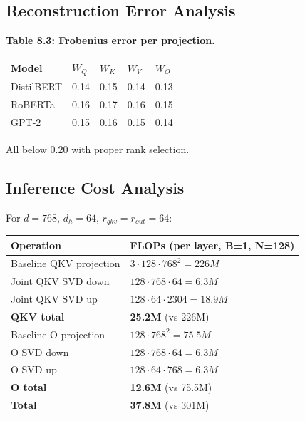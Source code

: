 \subsection{Reconstruction Error Analysis}

\textbf{Table 8.3: Frobenius error per projection.}

\begin{table}[H]
\centering
\small
\begin{tabular}{lllll}
\toprule
\textbf{Model} & \textbf{$W_Q$} & \textbf{$W_K$} & \textbf{$W_V$} & \textbf{$W_O$} \\
\midrule
DistilBERT & 0.14 & 0.15 & 0.14 & 0.13 \\
RoBERTa & 0.16 & 0.17 & 0.16 & 0.15 \\
GPT-2 & 0.15 & 0.16 & 0.15 & 0.14 \\
\bottomrule
\end{tabular}
\end{table}

All below 0.20 with proper rank selection.

\subsection{Inference Cost Analysis}

For $d = 768$, $d_h = 64$, $r_{qkv} = r_{out} = 64$:

\begin{table}[H]
\centering
\small
\begin{tabular}{ll}
\toprule
\textbf{Operation} & \textbf{FLOPs (per layer, B=1, N=128)} \\
\midrule
Baseline QKV projection & $3 \cdot 128 \cdot 768^2 = 226M$ \\
Joint QKV SVD down & $128 \cdot 768 \cdot 64 = 6.3M$ \\
Joint QKV SVD up & $128 \cdot 64 \cdot 2304 = 18.9M$ \\
\textbf{QKV total} & \textbf{25.2M} (vs 226M) \\
Baseline O projection & $128 \cdot 768^2 = 75.5M$ \\
O SVD down & $128 \cdot 768 \cdot 64 = 6.3M$ \\
O SVD up & $128 \cdot 64 \cdot 768 = 6.3M$ \\
\textbf{O total} & \textbf{12.6M} (vs 75.5M) \\
\textbf{Total} & \textbf{37.8M} (vs 301M) \\
\bottomrule
\end{tabular}
\end{table}

